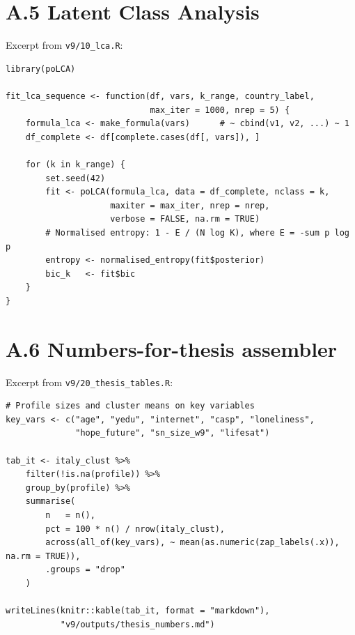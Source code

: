 \section{A.5\; Latent Class Analysis}
\label{sec:appA-lca}

Excerpt from \texttt{v9/10\_lca.R}:

\begin{lstlisting}[caption={LCA with poLCA; tertile discretisation of non-binary variables; fit sequence for $k = 2, \ldots, 8$.}]
library(poLCA)

fit_lca_sequence <- function(df, vars, k_range, country_label,
                             max_iter = 1000, nrep = 5) {
    formula_lca <- make_formula(vars)      # ~ cbind(v1, v2, ...) ~ 1
    df_complete <- df[complete.cases(df[, vars]), ]

    for (k in k_range) {
        set.seed(42)
        fit <- poLCA(formula_lca, data = df_complete, nclass = k,
                     maxiter = max_iter, nrep = nrep,
                     verbose = FALSE, na.rm = TRUE)
        # Normalised entropy: 1 - E / (N log K), where E = -sum p log p
        entropy <- normalised_entropy(fit$posterior)
        bic_k   <- fit$bic
    }
}
\end{lstlisting}

\section{A.6\; Numbers-for-thesis assembler}
\label{sec:appA-numbers}

Excerpt from \texttt{v9/20\_thesis\_tables.R}:

\begin{lstlisting}[caption={Profile-level summary exported to \texttt{thesis\_numbers.md}.}]
# Profile sizes and cluster means on key variables
key_vars <- c("age", "yedu", "internet", "casp", "loneliness",
              "hope_future", "sn_size_w9", "lifesat")

tab_it <- italy_clust %>%
    filter(!is.na(profile)) %>%
    group_by(profile) %>%
    summarise(
        n   = n(),
        pct = 100 * n() / nrow(italy_clust),
        across(all_of(key_vars), ~ mean(as.numeric(zap_labels(.x)), na.rm = TRUE)),
        .groups = "drop"
    )

writeLines(knitr::kable(tab_it, format = "markdown"),
           "v9/outputs/thesis_numbers.md")
\end{lstlisting}
